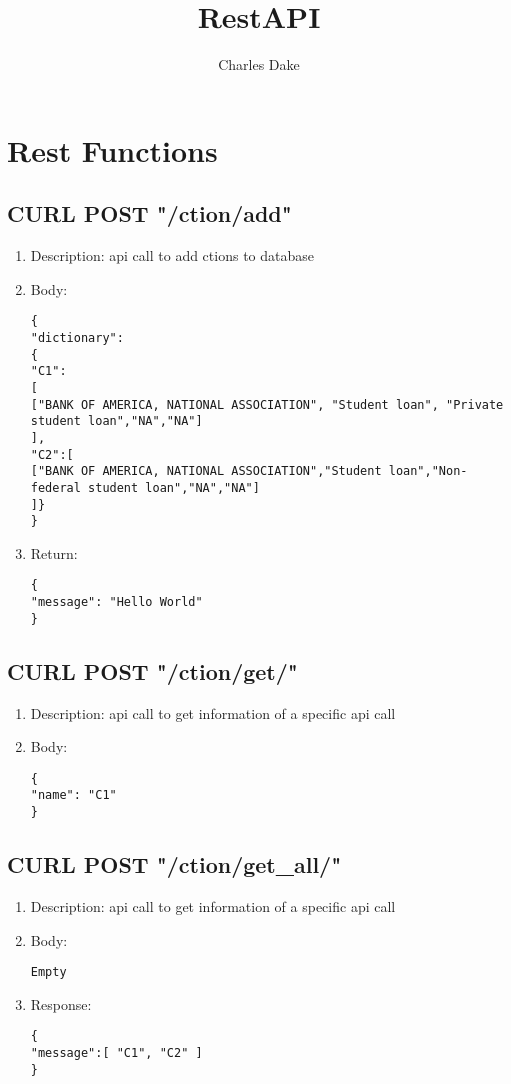 \documentclass{article}
\title{RestAPI}
\author{Charles Dake}
\begin{document}
\section{Rest Functions}

\subsection{CURL POST "/ction/add"}
\begin{enumerate}
\item Description: api call to add ctions to database
\item Body: 
\begin{lstlisting}
{ 
"dictionary":
{
"C1": 
[
["BANK OF AMERICA, NATIONAL ASSOCIATION", "Student loan", "Private student loan","NA","NA"]
],
"C2":[
["BANK OF AMERICA, NATIONAL ASSOCIATION","Student loan","Non-federal student loan","NA","NA"]
]}
}
\end{lstlisting}
\item Return:
\begin{lstlisting}
{ 
"message": "Hello World"
}
\end{lstlisting}
\end{enumerate}

\subsection{CURL POST "/ction/get/"}
\begin{enumerate}
\item Description: api call to get information of a specific api call
\item Body: 
\begin{lstlisting}
{ 
"name": "C1"
}
\end{lstlisting}
\end{enumerate}


\subsection{CURL POST "/ction/get_all/"}
\begin{enumerate}
\item Description: api call to get information of a specific api call
\item Body: 
\begin{lstlisting}
Empty
\end{lstlisting}
\item Response:
\begin{lstlisting}
{
"message":[ "C1", "C2" ]
}
\end{lstlisting}
\end{enumerate}
\end{document}
